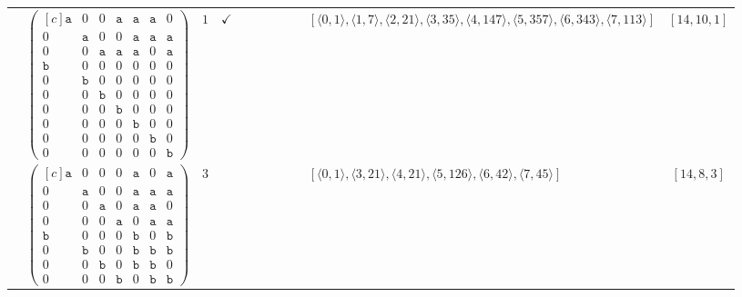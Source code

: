 \documentclass[12pt]{article}
\theoremstyle{definition}
\theoremstyle{plain}
\begin{document}
{\begin{longtable}{@{}cYcccccccZc@{}}
\cmidrule(lr){2-11}

& $\begin{pmatrix*}[c]
\mathtt{a}   &  0    &  0    &   \mathtt{a}  &  \mathtt{a}  &  \mathtt{a}  &  0  \\
0   &  \mathtt{a}    &  0    &   0  &  \mathtt{a}  &  \mathtt{a}  &  \mathtt{a}  \\
0   &  0    &  \mathtt{a}    &   \mathtt{a}  &  \mathtt{a}  &  0  &  \mathtt{a}  \\
\mathtt{b}   &  0    &  0    &   0  &  0  &  0  &  0  \\
0   &  \mathtt{b}    &  0    &   0  &  0  &  0  &  0  \\
0   &  0    &  \mathtt{b}    &   0  &  0  &  0  &  0  \\
0   &  0    &  0    &   \mathtt{b}  &  0  &  0  &  0  \\
0   &  0    &  0    &   0  &  \mathtt{b}  &  0  &  0  \\
0   &  0    &  0    &   0  &  0  &  \mathtt{b}  &  0  \\
0   &  0    &  0    &   0  &  0  &  0  &  \mathtt{b}
\end{pmatrix*}$
& $1$
& $\checkmark$
&
&
&
&
&
& $[\langle0,1\rangle,\allowbreak\langle1,7\rangle,\allowbreak\langle2,21\rangle,\allowbreak\langle3,35\rangle,\allowbreak\langle4,147\rangle,\allowbreak\langle5,357\rangle,\allowbreak\langle6,343\rangle,\allowbreak\langle7,113\rangle]$
& $[14,10,1]$     \\

\cmidrule(lr){2-11}

& $\begin{pmatrix*}[c]
\mathtt{a}   &  0    &  0    &   0  &  \mathtt{a}  &  0  &  \mathtt{a}  \\
0   &  \mathtt{a}    &  0    &   0  &  \mathtt{a}  &  \mathtt{a}  &  \mathtt{a}  \\
0   &  0    &  \mathtt{a}    &   0  &  \mathtt{a}  &  \mathtt{a}  &  0  \\
0   &  0    &  0    &   \mathtt{a}  &  0  &  \mathtt{a}  &  \mathtt{a}  \\
\mathtt{b}   &  0    &  0    &   0  &  \mathtt{b}  &  0  &  \mathtt{b}  \\
0   &  \mathtt{b}    &  0    &   0  &  \mathtt{b}  &  \mathtt{b}  &  \mathtt{b}  \\
0   &  0    &  \mathtt{b}    &   0  &  \mathtt{b}  &  \mathtt{b}  &  0  \\
0   &  0    &  0    &   \mathtt{b}  &  0  &  \mathtt{b}  &  \mathtt{b}
\end{pmatrix*}$
& $3$
&
&
&
&
&
&
& $[\langle0,1\rangle,\allowbreak\langle3,21\rangle,\allowbreak\langle4,21\rangle,\allowbreak\langle5,126\rangle,\allowbreak\langle6,42\rangle,\allowbreak\langle7,45\rangle]$
& $[14,8,3]$   \\


\end{longtable}}
\end{document}
